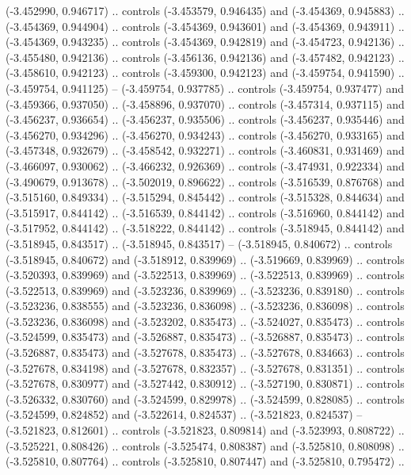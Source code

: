     (-3.452990, 0.946717) .. controls (-3.453579, 0.946435) and (-3.454369, 0.945883) ..
    (-3.454369, 0.944904) .. controls (-3.454369, 0.943601) and (-3.454369, 0.943911) ..
    (-3.454369, 0.943235) .. controls (-3.454369, 0.942819) and (-3.454723, 0.942136) ..
    (-3.455480, 0.942136) .. controls (-3.456136, 0.942136) and (-3.457482, 0.942123) ..
    (-3.458610, 0.942123) .. controls (-3.459300, 0.942123) and (-3.459754, 0.941590) ..
    (-3.459754, 0.941125) --
    (-3.459754, 0.937785) .. controls (-3.459754, 0.937477) and (-3.459366, 0.937050) ..
    (-3.458896, 0.937070) .. controls (-3.457314, 0.937115) and (-3.456237, 0.936654) ..
    (-3.456237, 0.935506) .. controls (-3.456237, 0.935446) and (-3.456270, 0.934296) ..
    (-3.456270, 0.934243) .. controls (-3.456270, 0.933165) and (-3.457348, 0.932679) ..
    (-3.458542, 0.932271) .. controls (-3.460831, 0.931469) and (-3.466097, 0.930062) ..
    (-3.466232, 0.926369) .. controls (-3.474931, 0.922334) and (-3.490679, 0.913678) ..
    (-3.502019, 0.896622) .. controls (-3.516539, 0.876768) and (-3.515160, 0.849334) ..
    (-3.515294, 0.845442) .. controls (-3.515328, 0.844634) and (-3.515917, 0.844142) ..
    (-3.516539, 0.844142) .. controls (-3.516960, 0.844142) and (-3.517952, 0.844142) ..
    (-3.518222, 0.844142) .. controls (-3.518945, 0.844142) and (-3.518945, 0.843517) ..
    (-3.518945, 0.843517) --
    (-3.518945, 0.840672) .. controls (-3.518945, 0.840672) and (-3.518912, 0.839969) ..
    (-3.519669, 0.839969) .. controls (-3.520393, 0.839969) and (-3.522513, 0.839969) ..
    (-3.522513, 0.839969) .. controls (-3.522513, 0.839969) and (-3.523236, 0.839969) ..
    (-3.523236, 0.839180) .. controls (-3.523236, 0.838555) and (-3.523236, 0.836098) ..
    (-3.523236, 0.836098) .. controls (-3.523236, 0.836098) and (-3.523202, 0.835473) ..
    (-3.524027, 0.835473) .. controls (-3.524599, 0.835473) and (-3.526887, 0.835473) ..
    (-3.526887, 0.835473) .. controls (-3.526887, 0.835473) and (-3.527678, 0.835473) ..
    (-3.527678, 0.834663) .. controls (-3.527678, 0.834198) and (-3.527678, 0.832357) ..
    (-3.527678, 0.831351) .. controls (-3.527678, 0.830977) and (-3.527442, 0.830912) ..
    (-3.527190, 0.830871) .. controls (-3.526332, 0.830760) and (-3.524599, 0.829978) ..
    (-3.524599, 0.828085) .. controls (-3.524599, 0.824852) and (-3.522614, 0.824537) ..
    (-3.521823, 0.824537) --
    (-3.521823, 0.812601) .. controls (-3.521823, 0.809814) and (-3.523993, 0.808722) ..
    (-3.525221, 0.808426) .. controls (-3.525474, 0.808387) and (-3.525810, 0.808098) ..
    (-3.525810, 0.807764) .. controls (-3.525810, 0.807447) and (-3.525810, 0.795472) ..
